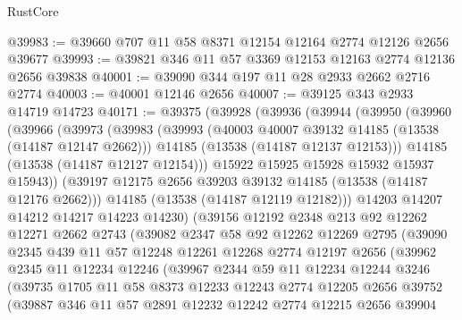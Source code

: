 \begin{lexlean}{RustCore}
\begin{coremodule}
@39983 := @39660 @707 @11 @58 @8371 @12154 @12164 @2774 @12126 @2656 @39677
@39993 := @39821 @346 @11 @57 @3369 @12153 @12163 @2774 @12136 @2656 @39838
@40001 := @39090 @344 @197 @11 @28 @2933 @2662 @2716 @2774
@40003 := @40001 @12146 @2656
@40007 := @39125 @343 @2933 @14719 @14723
@40171 := @39375
    (@39928
      (@39936
        (@39944
          (@39950
            (@39960
              (@39966
                (@39973
                  (@39983
                    (@39993
                      (@40003 @40007 @39132 @14185 (@13538 (@14187 @12147 @2662)))
                      @14185
                      (@13538 (@14187 @12137 @12153)))
                    @14185
                    (@13538 (@14187 @12127 @12154)))
                  @15922
                  @15925
                  @15928
                  @15932
                  @15937
                  @15943))
              (@39197 @12175 @2656 @39203 @39132 @14185 (@13538 (@14187 @12176 @2662)))
              @14185
              (@13538 (@14187 @12119 @12182)))
            @14203
            @14207
            @14212
            @14217
            @14223
            @14230)
          (@39156
            @12192
            @2348
            @213
            @92
            @12262
            @12271
            @2662
            @2743
            (@39082
              @2347
              @58
              @92
              @12262
              @12269
              @2795
              (@39090
                @2345
                @439
                @11
                @57
                @12248
                @12261
                @12268
                @2774
                @12197
                @2656
                (@39962
                  @2345
                  @11
                  @12234
                  @12246
                  (@39967
                    @2344
                    @59
                    @11
                    @12234
                    @12244
                    @3246
                    (@39735
                      @1705
                      @11
                      @58
                      @8373
                      @12233
                      @12243
                      @2774
                      @12205
                      @2656
                      @39752
                      (@39887
                        @346
                        @11
                        @57
                        @2891
                        @12232
                        @12242
                        @2774
                        @12215
                        @2656
                        @39904

\end{coremodule}
\end{lexlean}
